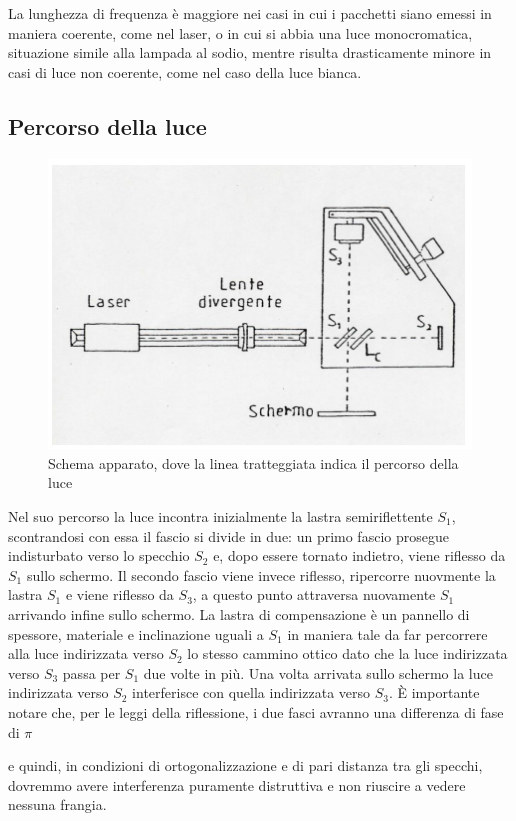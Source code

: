 \documentclass{article}
\begin{document}
La lunghezza di frequenza è maggiore nei casi in cui i pacchetti siano emessi in maniera coerente, come nel laser, o in cui si abbia una luce monocromatica, situazione simile alla lampada al sodio, mentre risulta drasticamente minore in casi di luce non coerente, come nel caso della luce bianca.


\subsection{Percorso della luce}

\begin{figure}[h!]
  \centering
  \includegraphics[width=0.7\linewidth]{IM percorso luce}
  \caption{Schema apparato, dove la linea tratteggiata indica il percorso della luce}
\end{figure}


Nel suo percorso la luce incontra inizialmente la lastra semiriflettente $S_1$, scontrandosi con essa il fascio si divide in due: un primo fascio prosegue indisturbato verso lo specchio $S_2$ e, dopo essere tornato indietro, viene riflesso da $S_1$ sullo schermo. Il secondo fascio viene invece riflesso, ripercorre nuovmente la lastra $S_1$ e viene riflesso da $S_3$, a questo punto attraversa nuovamente $S_1$ arrivando infine sullo schermo. La lastra di compensazione è un pannello di spessore, materiale e inclinazione uguali a $S_1$ in maniera tale da far percorrere alla luce indirizzata verso $S_2$ lo stesso cammino ottico dato che la luce indirizzata verso $S_3$ passa per $S_1$ due volte in più.
Una volta arrivata sullo schermo la luce indirizzata verso $S_2$ interferisce con quella indirizzata verso $S_3$. È importante notare che, per le leggi della riflessione, i due fasci avranno una differenza di fase di $\pi$  e quindi, in condizioni di ortogonalizzazione e di pari distanza tra gli specchi, dovremmo avere interferenza puramente distruttiva e non riuscire a vedere nessuna frangia.
\end{document}
